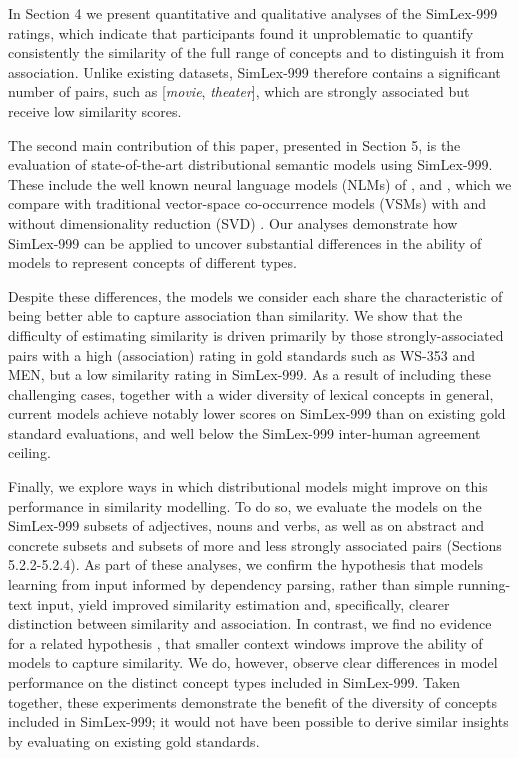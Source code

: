 \documentclass[fullname]{clv2}
\begin{document}
In Section 4 we present quantitative and qualitative analyses of the SimLex-999 ratings, which indicate that participants found it unproblematic to quantify consistently the similarity of the full range of concepts and to distinguish it from association. Unlike existing datasets, SimLex-999 therefore contains a significant number of pairs, such as [\emph{movie}, \emph{theater}], which are strongly associated but receive low similarity scores.   

The second main contribution of this paper, presented in Section 5, is the evaluation of state-of-the-art distributional semantic models using SimLex-999. These include the well known neural language models (NLMs) of ,  and , which we compare with traditional vector-space co-occurrence models (VSMs) \cite{turney2010frequency} with and without dimensionality reduction (SVD) \cite{landauer1997solution}. Our analyses demonstrate how SimLex-999 can be applied to uncover substantial differences in the ability of models to represent concepts of different types. 

Despite these differences, the models we consider each share the characteristic of being better able to capture association than similarity. We show that the difficulty of estimating similarity is driven primarily by those strongly-associated pairs with a high (association) rating in gold standards such as WS-353 and MEN, but a low similarity rating in SimLex-999. As a result of including these challenging cases, together with a wider diversity of lexical concepts in general, current models achieve notably lower scores on SimLex-999 than on existing gold standard evaluations, and well below the SimLex-999 inter-human agreement ceiling. 

Finally, we explore ways in which distributional models might improve on this performance in similarity modelling. To do so, we evaluate the models on the SimLex-999 subsets of adjectives, nouns and verbs, as well as on abstract and concrete subsets and subsets of more and less strongly associated pairs (Sections 5.2.2-5.2.4). As part of these analyses, we confirm the hypothesis \cite{agirre2009study,levy2014dependency} that models learning from input informed by dependency parsing, rather than simple running-text input, yield improved similarity estimation and, specifically, clearer distinction between similarity and association. In contrast, we find no evidence for a related hypothesis \cite{agirre2009study,kiela2014systematic}, that smaller context windows improve the ability of models to capture similarity. We do, however, observe clear differences in model performance on the distinct concept types included in SimLex-999. Taken together, these experiments demonstrate the benefit of the diversity of concepts included in SimLex-999; it would not have been possible to derive similar insights by evaluating on existing gold standards.
\end{document}
